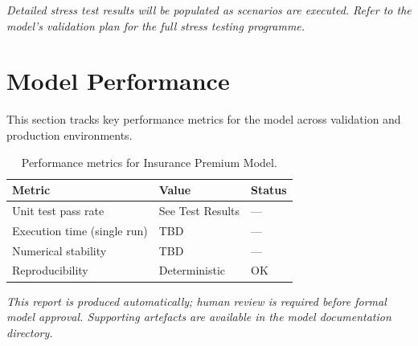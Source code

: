 \documentclass[11pt,a4paper]{article}
\begin{document}
\textit{Detailed stress test results will be populated as scenarios are executed.
Refer to the model's validation plan for the full stress testing programme.}

\section{Model Performance}

This section tracks key performance metrics for the model across
validation and production environments.

\begin{table}[H]
    \centering
    \caption{Performance metrics for Insurance Premium Model.}
    \begin{tabular}{lll}
        \toprule
        \textbf{Metric} & \textbf{Value} & \textbf{Status} \\
        \midrule
        Unit test pass rate & See Test Results & --- \\
        Execution time (single run) & TBD & --- \\
        Numerical stability & TBD & --- \\
        Reproducibility & Deterministic & OK \\
        \bottomrule
    \end{tabular}
\end{table}

\vspace{12pt}

\noindent\textit{\small This report is produced automatically; human review
is required before formal model approval. Supporting artefacts are available
in the model documentation directory.}
\end{document}
